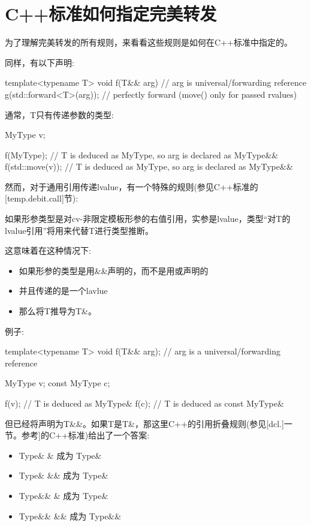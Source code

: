 \section{C++标准如何指定完美转发}
为了理解完美转发的所有规则，来看看这些规则是如何在C++标准中指定的。

同样，有以下声明:

\begin{cppcode}
template<typename T>
void f(T&& arg) // arg is universal/forwarding reference
{
	g(std::forward<T>(arg)); // perfectly forward (move() only for passed rvalues)
}
\end{cppcode}

通常，T只有传递参数的类型:

\begin{cppcode}
MyType v;

f(MyType{}); // T is deduced as MyType, so arg is declared as MyType&&
f(std::move(v)); // T is deduced as MyType, so arg is declared as MyType&&
\end{cppcode}

然而，对于通用引用传递lvalue，有一个特殊的规则(参见C++标准的[temp.debit.call]节):

如果形参类型是对cv-非限定模板形参的右值引用，实参是lvalue，类型“对T的lvalue引用”将用来代替T进行类型推断。



这意味着在这种情况下:

\begin{itemize}
	\item 如果形参的类型是用\&\&声明的，而不是用或声明的
	\item 并且传递的是一个lavlue
	\item 那么将T推导为T\&。
\end{itemize}

例子:

\begin{cppcode}
template<typename T>
void f(T&& arg); // arg is a universal/forwarding reference

MyType v;
const MyType c;

f(v); // T is deduced as MyType&
f(c); // T is deduced as const MyType&
\end{cppcode}

但已经将声明为T\&\&。如果T是T\&，那这里C++的引用折叠规则(参见[dcl.]一节。参考]的C++标准)给出了一个答案:

\begin{itemize}
	\item Type\& \& 成为 Type\&
	\item Type\& \&\& 成为 Type\&
	\item Type\&\& \& 成为 Type\&
	\item Type\&\& \&\& 成为 Type\&\&
\end{itemize}

